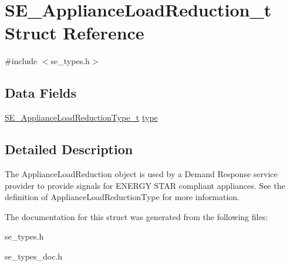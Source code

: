 \hypertarget{structSE__ApplianceLoadReduction__t}{}\section{S\+E\+\_\+\+Appliance\+Load\+Reduction\+\_\+t Struct Reference}
\label{structSE__ApplianceLoadReduction__t}


{\ttfamily \#include $<$se\+\_\+types.\+h$>$}

\subsection*{Data Fields}
\begin{DoxyCompactItemize}
\item 
\hyperlink{group__ApplianceLoadReductionType_ga05e14b2c51c55d623a23c75b2ccae048}{S\+E\+\_\+\+Appliance\+Load\+Reduction\+Type\+\_\+t} \hyperlink{group__ApplianceLoadReduction_ga734164d895f698ed8bb14ed7abafba0b}{type}
\end{DoxyCompactItemize}


\subsection{Detailed Description}
The Appliance\+Load\+Reduction object is used by a Demand Response service provider to provide signals for E\+N\+E\+R\+GY S\+T\+AR compliant appliances. See the definition of Appliance\+Load\+Reduction\+Type for more information. 

The documentation for this struct was generated from the following files\+:\begin{DoxyCompactItemize}
\item 
se\+\_\+types.\+h\item 
se\+\_\+types\+\_\+doc.\+h\end{DoxyCompactItemize}
